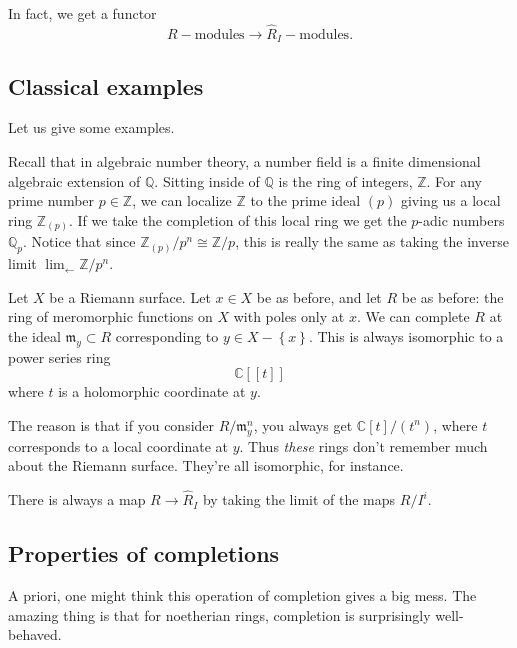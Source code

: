 In fact, we get a functor 
\[ R-\mathrm{modules} \to \hat{R}_I - \mathrm{modules}.  \]


\subsection{Classical examples}
Let us give some examples.
\begin{example}
Recall that in algebraic number theory, a number field is a 
finite dimensional algebraic extension of $\mathbb{Q}$. 
Sitting inside of $\mathbb{Q}$ is the ring of integers, $\mathbb{Z}$. For any prime number $p\in \mathbb{Z}$, we can localize $\mathbb{Z}$ to the 
 prime ideal $(p)$ giving us a local ring $\mathbb{Z}_(p)$. 
 If we take the completion of this local ring we get the $p$-adic numbers $\mathbb{Q}_p$. Notice that since $\mathbb{Z}_(p)/p^n\cong\mathbb{Z}/p$, this is really the same as taking the inverse limit $\lim_{\leftarrow}\mathbb{Z}/p^n$.
\end{example}

\begin{example} 
Let $X$ be a Riemann surface. Let $ x \in X$ be as before, and let $R$ be as
before: the ring of meromorphic functions on $X$ with poles only at $x$. We can
complete $R$ at the ideal $\mathfrak{m}_y \subset R$ corresponding to $y \in X - \left\{x\right\}$. This
is always isomorphic to a power series ring
\[ \mathbb{C}[[t]]  \]
where $t$ is a holomorphic coordinate at $y$. 

The reason is that if you consider $R/\mathfrak{m}_y^n$, you always get
$\mathbb{C}[t]/(t^n)$, where $t$ corresponds to a local coordinate at $y$. Thus
\emph{these} rings don't remember much about the Riemann surface. They're all
isomorphic, for instance. 
\end{example} 

\begin{remark} 
There is always a map $R \to \hat{R}_I$ by taking the limit of the maps $R/I^i$.
\end{remark} 

\subsection{Properties of completions}

A priori, one might think this operation of completion gives  a big mess. The amazing thing is that for
noetherian rings, completion is surprisingly well-behaved.


